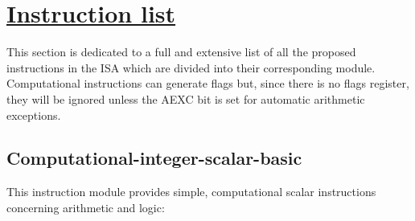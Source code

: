 \section[Instruction list]{\LARGE\underline{Instruction list}}

    \vspace{10pt}

    This section is dedicated to a full and extensive list of all the proposed instructions in the ISA which are divided into their corresponding module. Computational instructions can generate flags but, since there is no flags register, they will be ignored unless the AEXC bit is set for automatic arithmetic exceptions.

    \subsection{Computational-integer-scalar-basic}

        This instruction module provides simple, computational scalar instructions concerning arithmetic and logic:

